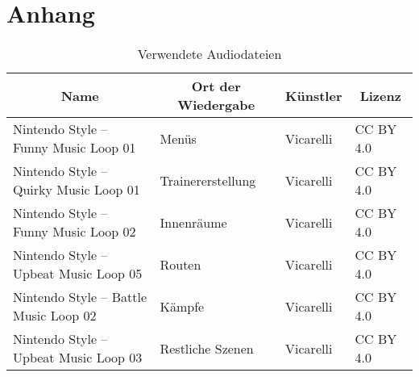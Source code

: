 \chapter*{Anhang}
\setlength{\LTleft}{-20cm plus -1fill}
\setlength{\LTright}{\LTleft}

\begin{longtable}{|l|l|l|l|} 
    \caption{Verwendete Audiodateien} \label{tab:audio} \\
    \hline \multicolumn{1}{|c|}{Name} & \multicolumn{1}{c|}{Ort der Wiedergabe} & \multicolumn{1}{c|}{Künstler} & \multicolumn{1}{c|}{Lizenz} \\ \hline 
    \endfirsthead
    \hline
    Nintendo Style – Funny Music Loop 01 & Menüs & Vicarelli \cite{filippovicarelli} & CC BY 4.0 \\
    Nintendo Style – Quirky Music Loop 01 & Trainererstellung & Vicarelli \cite{filippovicarelli} & CC BY 4.0 \\
    Nintendo Style – Funny Music Loop 02  & Innenräume & Vicarelli \cite{filippovicarelli} & CC BY 4.0 \\
    Nintendo Style – Upbeat Music Loop 05 & Routen & Vicarelli \cite{filippovicarelli} & CC BY 4.0 \\
    Nintendo Style – Battle Music Loop 02 & Kämpfe & Vicarelli \cite{filippovicarelli} & CC BY 4.0 \\
    Nintendo Style – Upbeat Music Loop 03 & Restliche Szenen & Vicarelli \cite{filippovicarelli} & CC BY 4.0 \\
    \hline
\end{longtable}

